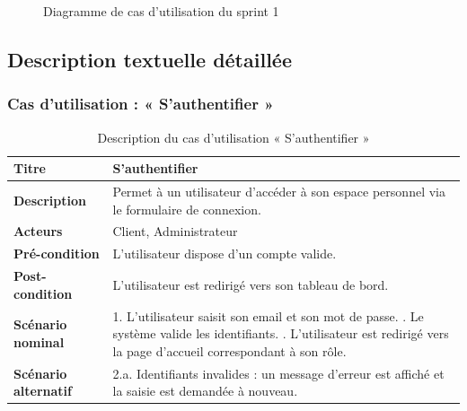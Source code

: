 \begin{figure}[h!]
\centering
\caption{Diagramme de cas d'utilisation du sprint 1}
\label{fig:uc-sprint1}
\end{figure}

\subsection{Description textuelle détaillée}

\subsubsection{Cas d'utilisation : « S'authentifier »}
\begin{table}[h!]
\centering
\renewcommand{\arraystretch}{1.3}
\begin{tabularx}{\textwidth}{|l|X|}
\hline
\textbf{Titre} & S'authentifier \\ \hline
\textbf{Description} & Permet à un utilisateur d'accéder à son espace personnel via
le formulaire de connexion. \\ \hline
\textbf{Acteurs} & Client, Administrateur \\ \hline
\textbf{Pré-condition} & L'utilisateur dispose d'un compte valide. \\ \hline
\textbf{Post-condition} & L'utilisateur est redirigé vers son tableau de bord. \\ \hline
\textbf{Scénario nominal} &
1. L'utilisateur saisit son email et son mot de passe. \newline
2. Le système valide les identifiants. \newline
3. L'utilisateur est redirigé vers la page d'accueil correspondant à son rôle. \\ \hline
\textbf{Scénario alternatif} &
2.a. Identifiants invalides : un message d'erreur est affiché et la saisie est demandée
à nouveau. \\ \hline
\end{tabularx}
\caption{Description du cas d'utilisation « S'authentifier »}
\end{table}

